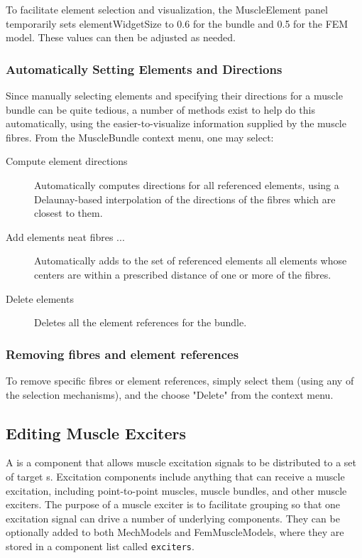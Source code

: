\documentclass{article}
\begin{document}
To facilitate element selection and visualization,
the MuscleElement panel
temporarily sets {\sf elementWidgetSize} to 0.6 for the bundle and 0.5 for
the FEM model. These values can then be adjusted as needed.

\subsubsection{Automatically Setting Elements and Directions}

Since manually selecting elements and specifying their directions for
a muscle bundle can be quite tedious, a number of methods exist to
help do this automatically, using the easier-to-visualize information
supplied by the muscle fibres. From the MuscleBundle context menu, one
may select:

\begin{description}

\item[Compute element directions]\mbox{}

Automatically computes directions for all referenced elements,
using a Delaunay-based interpolation of the directions of the
fibres which are closest to them.

\item[Add elements neat fibres ...]\mbox{}

Automatically adds to the set of referenced elements
all elements whose centers are within
a prescribed distance of one or more of the fibres.

\item[Delete elements]\mbox{}

Deletes all the element references for the bundle.

\end{description}

\subsubsection{Removing fibres and element references}

To remove specific fibres or element references, simply select them
(using any of the selection mechanisms), and the choose {\sf "Delete"}
from the context menu.

\subsection{Editing Muscle Exciters}

A  is a component that
allows muscle excitation signals to be distributed to a set of target
s.  Excitation
components include anything that can receive a muscle excitation, including
point-to-point muscles, muscle bundles, and other muscle exciters.
The purpose of a muscle exciter is to facilitate grouping so that one
excitation signal can drive a number of underlying components.
They can be optionally added to both MechModels and FemMuscleModels,
where they are stored in a component list called {\tt exciters}. 
\end{document}
